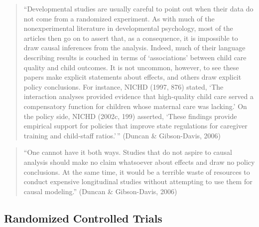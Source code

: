 \documentclass[
  letterpaper,
  DIV=11,
  numbers=noendperiod]{scrreprt}
\begin{document}
\begin{quote}
``Developmental studies are usually careful to point out when their data
do not come from a randomized experiment. As with much of the
nonexperimental literature in developmental psychology, most of the
articles then go on to assert that, as a consequence, it is impossible
to draw causal inferences from the analysis. Indeed, much of their
language describing results is couched in terms of `associations'
between child care quality and child outcomes. It is not uncommon,
however, to see these papers make explicit statements about effects, and
others draw explicit policy conclusions. For instance, NICHD (1997, 876)
stated, `The interaction analyses provided evidence that high-quality
child care served a compensatory function for children whose maternal
care was lacking.' On the policy side, NICHD (2002c, 199) asserted,
`These findings provide empirical support for policies that improve
state regulations for caregiver training and child-staff ratios.'\,''
(Duncan \& Gibson-Davis, 2006)
\end{quote}

\begin{quote}
``One cannot have it both ways. Studies that do not aspire to causal
analysis should make no claim whatsoever about effects and draw no
policy conclusions. At the same time, it would be a terrible waste of
resources to conduct expensive longitudinal studies without attempting
to use them for causal modeling.'' (Duncan \& Gibson-Davis, 2006)
\end{quote}

\subsection{Randomized Controlled
Trials}\label{randomized-controlled-trials}
\end{document}
